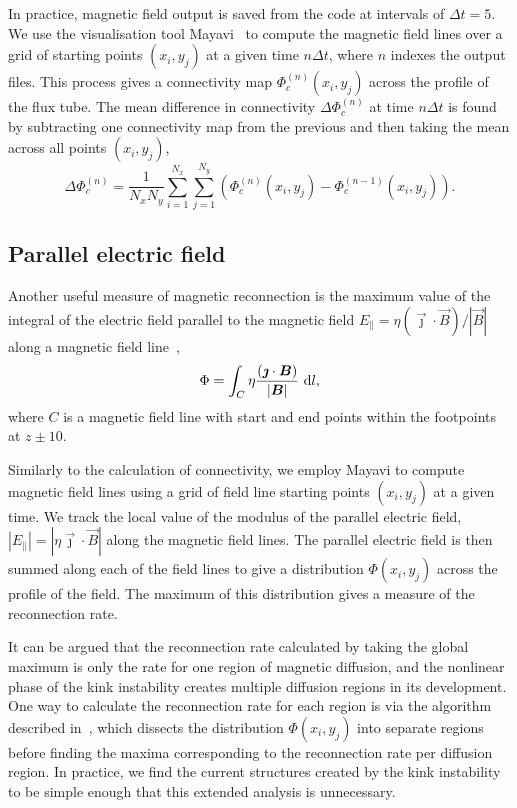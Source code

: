 In practice, magnetic field output is saved from the code at
intervals of $\Delta t = 5$. We use the visualisation tool
Mayavi~\cite{ramachandran2011mayavi} to compute the magnetic field
lines over a grid of starting points $(x_i, y_j)$ at a given time $n
\Delta t$, where $n$ indexes the output files. This process gives a
connectivity map $\Phi_c^{(n)}(x_i, y_j)$ across the profile of the
flux tube. The mean difference in connectivity $\Delta
\Phi_c^{(n)}$ at time $n\Delta t$ is found by subtracting one connectivity map from the previous and then taking the mean across all points $(x_i, y_j)$,
\begin{equation}
  \Delta \Phi_c^{(n)} = \frac{1}{N_x N_y} \sum_{i=1}^{N_x} \sum_{j=1}^{N_y} (\Phi_c^{(n)}(x_i, y_j) - \Phi_c^{(n-1)}(x_i, y_j)).
\end{equation}

\subsection{Parallel electric field}

Another useful measure of magnetic reconnection is the maximum value of the integral of the electric field parallel to the magnetic field $E_{\parallel} = \eta {(\vec{\jmath} \cdot \vec{B})}/|\vec{B}|$ along a magnetic field line~\cite{galsgaardSteadyStateReconnection2011,priestNatureThreedimensionalMagnetic2003,schindlerGeneralMagneticReconnection1988},
\begin{equation}
  \Phi = \int_{C} \eta \frac{(\vec{\jmath} \cdot \vec{B})}{|\vec{B}|}\ {\rm d}l,
\end{equation}
where $C$ is a magnetic field line with start and end points within the footpoints at $z\pm10$.

Similarly to the calculation of connectivity, we employ Mayavi to
compute magnetic field lines using a grid of field line starting
  points $(x_i, y_j)$ at a given time. We track the local value of
the modulus of the parallel electric field, $|E_{\parallel}| =
|\eta \vec{\jmath} \cdot \vec{B}|$ along the magnetic field lines. The
parallel electric field is then summed along each of the field lines
to give a distribution $\Phi(x_i, y_j)$ across the profile of the field. The maximum of this distribution gives a measure of the reconnection rate.

It can be argued that the reconnection rate calculated by taking the global maximum is only the rate for one region of magnetic diffusion, and the nonlinear phase of the kink instability creates multiple diffusion regions in its development. One way to calculate the reconnection rate for each region is via the algorithm described in~\cite{pontinDynamicsBraidedCoronal2011}, which dissects the distribution $\Phi(x_i, y_j)$ into separate regions before finding the maxima corresponding to the reconnection rate per diffusion region. In practice, we find the current structures created by the kink instability to be simple enough that this extended analysis is unnecessary.

